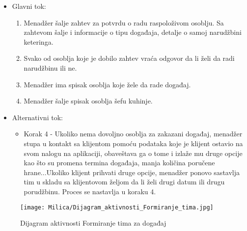 \documentclass[a4paper]{article}
\begin{document}
      \begin{itemize}
        \item Glavni tok:
          \begin{enumerate}
              \item Menadžer šalje zahtev za potvrdu o radu raspoloživom osoblju. Sa zahtevom šalje i informacije o tipu događaja, detalje o samoj narudžbini keteringa.
        
              \item Svako od osoblja koje je dobilo zahtev vraća odgovor da li želi da radi narudžbinu ili ne.
         
        
              \item Menadžer ima spisak osoblja koje žele da rade događaj.
          
              \item Menadžer šalje spisak osoblja šefu kuhinje.
          \end{enumerate}
    \end{itemize}
      \begin{itemize}
        \item Alternativni tok:
          \begin{itemize}
        \item Korak 4 - Ukoliko nema dovoljno osoblja za zakazani događaj, menadžer stupa u kontakt sa klijentom pomoću podataka koje je klijent ostavio na svom nalogu na aplikaciji, obaveštava ga o tome i izlaže mu druge opcije kao što su promena termina događaja, manja količina poručene hrane...Ukoliko klijent prihvati druge opcije, menadžer ponovo sastavlja tim u skladu sa klijentovom željom da li želi drugi datum ili drugu porudžbinu. Proces se nastavlja u koraku 4.
    \end{itemize}
    \end{itemize}
    
    
\begin{figure}[H]
    \centering
    \texttt{[image: Milica/Dijagram\_aktivnosti\_Formiranje\_tima.jpg]}
    \caption{Dijagram aktivnosti Formiranje tima za događaj }
    \label{fig:FormiranjeTima}
\end{figure}
\end{document}
